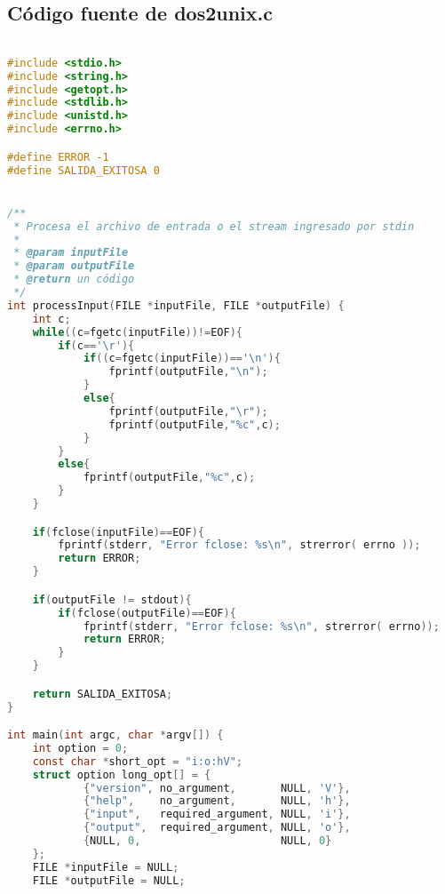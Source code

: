 \documentclass[a4paper]{article}
\begin{document}
\subsection{Código fuente de dos2unix.c}
\begin{lstlisting}[language=C]

#include <stdio.h>
#include <string.h>
#include <getopt.h>
#include <stdlib.h>
#include <unistd.h>
#include <errno.h>

#define ERROR -1
#define SALIDA_EXITOSA 0


/**
 * Procesa el archivo de entrada o el stream ingresado por stdin
 *
 * @param inputFile
 * @param outputFile
 * @return un código
 */
int processInput(FILE *inputFile, FILE *outputFile) {
    int c;
    while((c=fgetc(inputFile))!=EOF){
        if(c=='\r'){
        	if((c=fgetc(inputFile))=='\n'){
        		fprintf(outputFile,"\n");
        	}
        	else{
        		fprintf(outputFile,"\r");
        		fprintf(outputFile,"%c",c);
        	}
        }
        else{
            fprintf(outputFile,"%c",c);
        }
    }

    if(fclose(inputFile)==EOF){
        fprintf(stderr, "Error fclose: %s\n", strerror( errno ));
        return ERROR;
    }

    if(outputFile != stdout){
        if(fclose(outputFile)==EOF){
            fprintf(stderr, "Error fclose: %s\n", strerror( errno));
            return ERROR;
        }
    }

    return SALIDA_EXITOSA;
}

int main(int argc, char *argv[]) {
    int option = 0;
    const char *short_opt = "i:o:hV";
    struct option long_opt[] = {
            {"version", no_argument,       NULL, 'V'},
            {"help",    no_argument,       NULL, 'h'},
            {"input",   required_argument, NULL, 'i'},
            {"output",  required_argument, NULL, 'o'},
            {NULL, 0,                      NULL, 0}
    };
    FILE *inputFile = NULL;
    FILE *outputFile = NULL;


\end{lstlisting}
\end{document}
